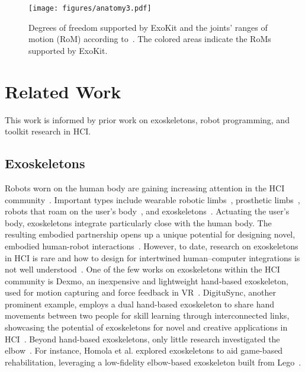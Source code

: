 
\begin{figure*}[tb]
    \centering
    \texttt{[image: figures/anatomy3.pdf]}
    \caption{Degrees of freedom supported by ExoKit and the joints' ranges of motion (RoM) according to~\cite{norkin_2016}. The colored areas indicate the RoMs supported by ExoKit.}
    \label{fig:biomechanics}
\end{figure*}

\section{Related Work}
This work is informed by prior work on exoskeletons, robot programming, and toolkit research in HCI.

\subsection{Exoskeletons}
Robots worn on the human body are gaining increasing attention in the HCI community~\cite{inami_2022, muehlhaus_2023,saberpour_2023}.
Important types include wearable robotic limbs~\cite{saraiji_2018,yamamura_2023}, prosthetic limbs~\cite{hofmann_2016,phelan_2021}, robots that roam on the user's body~\cite{dementyev_2016,kao_2017,sathya_2022}, and exoskeletons~\cite{nishida_2020, gu_2016,li_2023}. Actuating the user's body, exoskeletons integrate particularly close with the human body. The resulting embodied partnership opens up a unique potential for designing novel, embodied human-robot interactions~\cite{li_2023}.
However, to date, research on exoskeletons in HCI is rare and how to design for intertwined human–computer integrations is not well understood~\cite{mueller_2023}. One of the few works on exoskeletons within the HCI community is Dexmo, an inexpensive and lightweight hand-based exoskeleton, used for motion capturing and force feedback in VR~\cite{gu_2016}. DigituSync, another prominent example, employs a dual hand-based exoskeleton to share hand movements between two people for skill learning through interconnected links, showcasing the potential of exoskeletons for novel and creative applications in HCI~\cite{nishida_2022}.
Beyond hand-based exoskeletons, only little research investigated the elbow~\cite{teng_2022,homola_2022}. For instance, Homola et al. explored exoskeletons to aid game-based rehabilitation, leveraging a low-fidelity elbow-based exoskeleton built from Lego~\cite{homola_2022}. 


